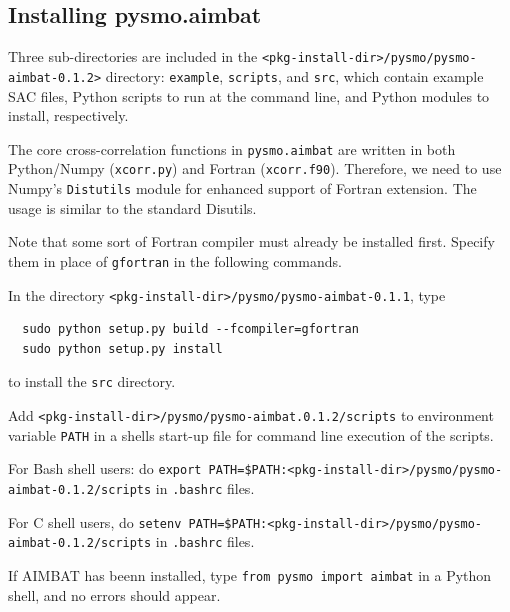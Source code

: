 \documentclass[letterpaper,10pt]{article}
\begin{document}
\subsection{Installing pysmo.aimbat}

Three sub-directories are included in the \verb"<pkg-install-dir>/pysmo/pysmo-aimbat-0.1.2>" directory: \verb"example", \verb"scripts", and \verb"src", which contain example SAC files, Python scripts to run at the command line, and Python modules to install, respectively.

The core cross-correlation functions in \verb"pysmo.aimbat" are written in both Python/Numpy (\verb"xcorr.py") and Fortran (\verb"xcorr.f90"). Therefore, we need to use Numpy's \verb"Distutils" module for enhanced support of Fortran extension. The usage is similar to the standard Disutils. 

Note that some sort of Fortran compiler must already be installed first. Specify them in place of \verb"gfortran" in the following commands.

In the directory \verb"<pkg-install-dir>/pysmo/pysmo-aimbat-0.1.1", type

\begin{verbatim}
  sudo python setup.py build --fcompiler=gfortran
  sudo python setup.py install 
\end{verbatim}

to install the \verb"src" directory. 

Add \verb"<pkg-install-dir>/pysmo/pysmo-aimbat.0.1.2/scripts" to environment variable \verb"PATH" in a shells start-up file for command line execution of the scripts.

For Bash shell users: do \verb"export PATH=$PATH:<pkg-install-dir>/pysmo/pysmo-aimbat-0.1.2/scripts" in \verb".bashrc" files.

For C shell users, do \verb"setenv PATH=$PATH:<pkg-install-dir>/pysmo/pysmo-aimbat-0.1.2/scripts" in \verb".bashrc" files.

If AIMBAT has beenn installed, type \verb"from pysmo import aimbat" in a Python shell, and no errors should appear. 





















\end{document}
